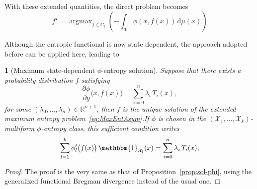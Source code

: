 \documentclass[english,sort&compress]{elsarticle}
\theoremstyle{definition}
\theoremstyle{plain}
\newtheorem{prop}{\protect\propositionname}
\theoremstyle{plain}
\providecommand{\propositionname}{Proposition}
\def\dmu{\mathrm{d}\mu}
\def\Rset{\mathbb{R}}
\def\X{\mathcal{X}}
\def\un{\mathbbm{1}}
\DeclareMathOperator*{\argmax}{\operatorname{argmax}}
\begin{document}
\

With these extended quantities, the direct problem becomes
%
\begin{equation}\label{eq:MaxEntAsym}
f^\star = \argmax_{f \in C_t} \left( - \int_\X \phi(x,f(x)) \, \dmu(x) \right)
\end{equation}

Although the  entropic functional is  now state dependent, the  approach adopted
before can be applied here, leading to

\begin{prop}[Maximum                state-dependent               $\phi$-entropy
  solution]\label{prop:sol-asym_phi}
%
  Suppose that there exists a probability distribution $f$ satisfying
  \begin{equation}\label{eq:sol-asym_phi}
  \frac{\partial \phi}{\partial y}\big(x,f(x)\big) = \sum_{i=0}^n \lambda_i \,
T_i(x),
  \end{equation}
  for  some  $(\lambda_0,\ldots,\lambda_n) \in  \Rset^{n+1}$,  then  $f$ is  the
  unique      solution      of       the      extended      maximum      entropy
  problem~\eqref{eq:MaxEntAsym}.\newline  If $\phi$  is chosen  in the  $(\X_1 ,
  \ldots  , \X_k)$-multiform  $\phi$-entropy  class,  this sufficient  condition
  writes
  \begin{equation}\label{eq:sol-multiform_phi}
  \sum_{l=1}^k \phi_l'\big(f(x)\big) \, \un_{\X_l}(x) =
  \sum_{i=0}^n \lambda_i \, T_i(x),
  \end{equation}
\end{prop}
%
\begin{proof}
  The proof  is the very  same as that of  Proposition~\ref{prop:sol-phi}, using
  the generalized functional Bregman divergence instead of the usual one.
\end{proof}
\end{document}
